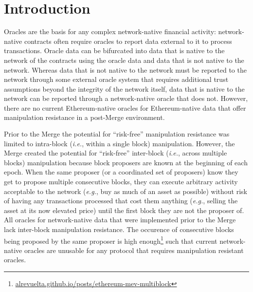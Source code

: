 \documentclass[tikz]{article}
\newcommand{\fref}[1]{\footnote{\href{http://#1}{#1}}}
\begin{document}
\newpage

\thispagestyle{empty} %

\cleardoublepage
{}
{\large\tableofcontents} %
\cleardoublepage
{}


\newpage
\setcounter{page}{3} %

\section{Introduction}
Oracles are the basis for any complex network-native financial activity: network-native contracts often require oracles to report data external to it to process transactions. Oracle data can be bifurcated into data that is native to the network of the contracts using the oracle data and data that is not native to the network. Whereas data that is not native to the network must be reported to the network through some external oracle system that requires additional trust assumptions beyond the integrity of the network itself, data that is native to the network can be reported through a network-native oracle that does not. However, there are no current Ethereum-native oracles for Ethereum-native data that offer manipulation resistance in a post-Merge environment. 

Prior to the Merge the potential for “risk-free” manipulation resistance was limited to intra-block (\textit{i.e.}, within a single block) manipulation. However, the Merge created the potential for “risk-free” inter-block (\textit{i.e.}, across multiple blocks) manipulation because block proposers are known at the beginning of each epoch. When the same proposer (or a coordinated set of proposers) know they get to propose multiple consecutive blocks, they can execute arbitrary activity acceptable to the network (\textit{e.g.}, buy as much of an asset as possible) without risk of having any transactions processed that cost them anything (\textit{e.g.}, selling the asset at its now elevated price) until the first block they are not the proposer of. All oracles for network-native data that were implemented prior to the Merge lack inter-block manipulation resistance. The occurence of consecutive blocks being proposed by the same proposer is high enough\fref{alrevuelta.github.io/posts/ethereum-mev-multiblock} such that current network-native oracles are unusable for any protocol that requires manipulation resistant oracles. 
\end{document}
